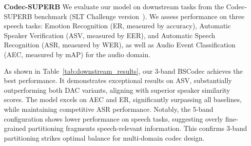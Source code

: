 \documentclass[11pt]{article}
\newcommand{\red}[1]{\textcolor{red}{#1}}
\begin{document}
\noindent\textbf{Codec-SUPERB}
We evaluate our model on downstream tasks from the Codec-SUPERB benchmark (SLT Challenge version~\cite{wu2024codec}). We assess performance on three speech tasks: Emotion Recognition (ER, measured by accuracy), Automatic Speaker Verification (ASV, measured by EER), and Automatic Speech Recognition (ASR, measured by WER), as well as Audio Event Classification (AEC, measured by mAP) for the audio domain.



As shown in Table~\ref{tab:downstream_results}, our 3-band BSCodec achieves the best performance. It demonstrates exceptional results on ASV, substantially outperforming both DAC variants, aligning with superior speaker similarity scores. The model excels on AEC and ER, significantly surpassing all baselines, while maintaining competitive ASR performance. Notably, the 5-band configuration shows lower performance on speech tasks, suggesting overly fine-grained partitioning fragments speech-relevant information. This confirms 3-band partitioning strikes optimal balance for multi-domain codec design.
\end{document}
